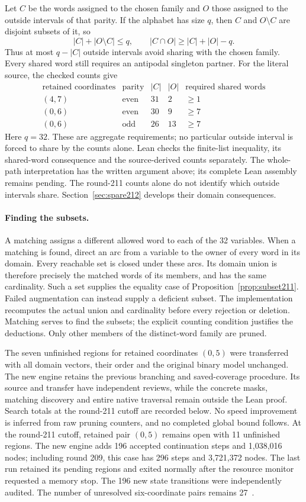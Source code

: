 \documentclass[11pt,a4paper]{article}
\theoremstyle{definition}
\theoremstyle{remark}
\begin{document}
Let $C$ be the words assigned to the chosen family and $O$ those assigned
to the outside intervals of that parity. If the alphabet has size $q$,
then $C$ and $O\setminus C$ are disjoint subsets of it, so
\[
|C|+|O\setminus C|\le q,\qquad
|C\cap O|\ge |C|+|O|-q.
\]
Thus at most $q-|C|$ outside intervals avoid sharing with the chosen
family. Every shared word still requires an antipodal singleton partner.
For the literal source, the checked counts give
\[
\begin{array}{c|c|r|r|r}
\text{retained coordinates}&\text{parity}&|C|&|O|&
\text{required shared words}\\\hline
(4,7)&\text{even}&31&2&\ge1\\
(0,6)&\text{even}&30&9&\ge7\\
(0,6)&\text{odd}&26&13&\ge7
\end{array}
\]
Here $q=32$. These are aggregate requirements; no particular outside
interval is forced to share by the counts alone. Lean checks the
finite-list inequality, its shared-word consequence and the source-derived
counts separately. The whole-path interpretation has the written argument
above; its complete Lean assembly remains pending. The round-211 counts alone do not identify which outside intervals
share. Section~\ref{sec:spare212} develops their domain consequences.

\paragraph{Finding the subsets.}
A matching assigns a different allowed word to each of the 32 variables.
When a matching is found, direct an arc from a variable to the owner of
every word in its domain. Every reachable set is closed under these arcs.
Its domain union is therefore precisely the matched words of its members,
and has the same cardinality. Such a set supplies the equality case of
Proposition~\ref{prop:subset211}. Failed augmentation can instead supply
a deficient subset. The implementation recomputes the actual union and
cardinality before every rejection or deletion. Matching serves to find
the subsets; the explicit counting condition justifies the deductions.
Only other members of the distinct-word family are pruned.

The seven unfinished regions for retained coordinates $(0,5)$ were
transferred with all domain vectors, their order and the original binary
model unchanged. The new engine retains the previous branching and
saved-coverage procedure. Its source and transfer have independent
reviews, while the concrete masks, matching discovery and entire native
traversal remain outside the Lean proof. Search totals at the round-211
cutoff are recorded below. No speed improvement is inferred from raw
pruning counters, and no completed global bound follows.
At the round-211 cutoff, retained pair $(0,5)$ remains open with
11 unfinished regions. The new engine adds 196 accepted continuation
steps and 1,038,016 nodes; including round 209, this case has 296 steps
and 3,721,372 nodes. The last run retained its pending regions and exited
normally after the resource monitor requested a memory stop. The 196
new state transitions were independently audited. The number of unresolved
six-coordinate pairs remains 27~\cite{research211}.
\end{document}
